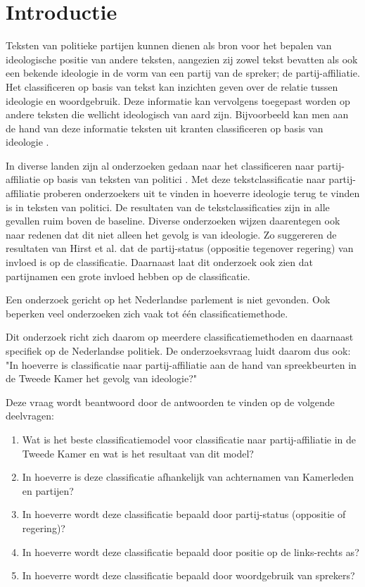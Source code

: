 \section{Introductie}
\label{sec:intro}
Teksten van politieke partijen kunnen dienen als bron voor het bepalen van ideologische positie van andere teksten, aangezien zij zowel tekst bevatten als ook een bekende ideologie in de vorm van een partij van de spreker; de partij-affiliatie. Het classificeren op basis van tekst kan inzichten geven over de relatie tussen ideologie en woordgebruik. Deze informatie kan vervolgens toegepast worden op andere teksten die wellicht ideologisch van aard zijn. Bijvoorbeeld kan men aan de hand van deze informatie teksten uit kranten classificeren op basis van ideologie \cite{DBLP:journals/corr/Biessmann16,Hirst_textto}.\par
In diverse landen zijn al onderzoeken gedaan naar het classificeren naar partij-affiliatie op basis van teksten van politici \cite{DBLP:journals/corr/Biessmann16,Ferreira2016UsingTT}. Met deze tekstclassificatie naar partij-affiliatie proberen onderzoekers uit te vinden in hoeverre ideologie terug te vinden is in teksten van politici. De resultaten van de tekstclassificaties zijn in alle gevallen ruim boven de baseline. Diverse onderzoeken wijzen daarentegen ook naar redenen dat dit niet alleen het gevolg is van ideologie. Zo suggereren de  resultaten van Hirst et al. \cite{Hirst_textto} dat de partij-status (oppositie tegenover regering) van invloed is op de classificatie. Daarnaast laat dit onderzoek ook zien dat partijnamen een grote invloed hebben op de classificatie.\par
Een onderzoek gericht op het Nederlandse parlement is niet gevonden. Ook beperken veel onderzoeken zich vaak tot één classificatiemethode.\par
Dit onderzoek richt zich daarom op meerdere classificatiemethoden en daarnaast specifiek op de Nederlandse politiek. De onderzoeksvraag luidt daarom dus ook: "In hoeverre is classificatie naar partij-affiliatie aan de hand van spreekbeurten in de Tweede Kamer het gevolg van ideologie?"\par
Deze vraag wordt beantwoord door de antwoorden te vinden op de volgende deelvragen:
\begin{enumerate}
    \item Wat is het beste classificatiemodel voor classificatie naar partij-affiliatie in de Tweede Kamer en wat is het resultaat van dit model?
    \item In hoeverre is deze classificatie afhankelijk van achternamen van Kamerleden en partijen?
    \item In hoeverre wordt deze classificatie bepaald door partij-status (oppositie of regering)?
    \item In hoeverre wordt deze classificatie bepaald door positie op de links-rechts as?
    \item In hoeverre wordt deze classificatie bepaald door woordgebruik van sprekers?
\end{enumerate}
